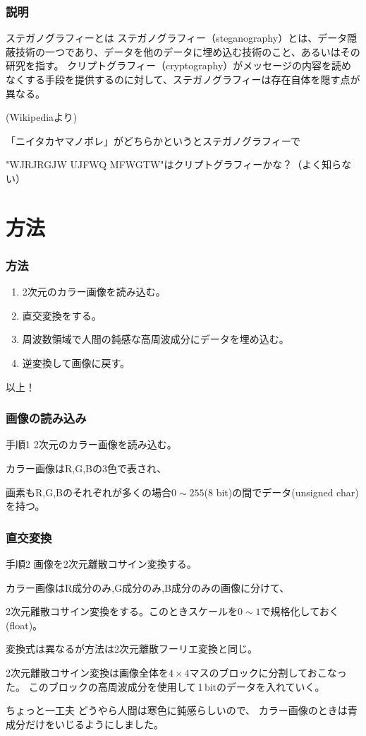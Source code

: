 \documentclass[dvipdfmx,11pt,notheorems]{beamer}
\theoremstyle{definition}
\begin{document}
\begin{frame}\frametitle{説明}
	\begin{block}{ステガノグラフィーとは}
		ステガノグラフィー（steganography）とは、データ隠蔽技術の一つであり、データを他のデータに埋め込む技術のこと、あるいはその研究を指す。
		クリプトグラフィー（cryptography）がメッセージの内容を読めなくする手段を提供するのに対して、ステガノグラフィーは存在自体を隠す点が異なる。

		(Wikipediaより)
	\end{block}
	「ニイタカヤマノボレ」がどちらかというとステガノグラフィーで

	"WJRJRGJW UJFWQ MFWGTW"はクリプトグラフィーかな？（よく知らない）
\end{frame}

\section{方法}
\begin{frame}\frametitle{方法}
	\begin{enumerate}
		\item 2次元のカラー画像を読み込む。
		\item 直交変換をする。
		\item 周波数領域で人間の鈍感な高周波成分にデータを埋め込む。
		\item 逆変換して画像に戻す。
	\end{enumerate}
	以上！
\end{frame}

\begin{frame}\frametitle{画像の読み込み}
	\begin{block}{手順1}
		2次元のカラー画像を読み込む。
	\end{block}
	カラー画像はR,G,Bの3色で表され、

	画素もR,G,Bのそれぞれが多くの場合$0\sim 255$(8 bit)の間でデータ(unsigned char)を持つ。
\end{frame}

\begin{frame}\frametitle{直交変換}
	\begin{block}{手順2}
		画像を2次元離散コサイン変換する。
	\end{block}
	カラー画像はR成分のみ,G成分のみ,B成分のみの画像に分けて、

	2次元離散コサイン変換をする。このときスケールを$0\sim 1$で規格化しておく(float)。

	変換式は異なるが方法は2次元離散フーリエ変換と同じ。

	2次元離散コサイン変換は画像全体を$4\times 4$マスのブロックに分割しておこなった。
	このブロックの高周波成分を使用して\,1\,bitのデータを入れていく。
	\begin{exampleblock}{ちょっと一工夫}
		どうやら人間は寒色に鈍感らしいので、
		カラー画像のときは青成分だけをいじるようにしました。
	\end{exampleblock}
\end{frame}
\end{document}
